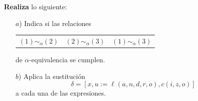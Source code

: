 \documentclass{article}
\begin{document}
\begin{itemize}
\begin{enumerate}
  \end{enumerate}
  \textbf{Realiza} lo siguiente:
  \begin{itemize}
  \item[$a$)] Indica si las relaciones
    \begin{center}
      \begin{tabular}{ c  c  c}
        $(1) \sim_{\alpha} (2)$ \hspace*{1cm} & $(2) \sim_{\alpha} (3)$ \hspace*{1cm} & $(1) \sim_{\alpha} (3)$
      \end{tabular} 
    \end{center}
    de $\alpha$-equivalencia se cumplen.
  \item[$b$)] Aplica la sustitución
    \[
    \delta = [x, u := \ell(a, n, d, r, o), c(i, z, o)]
    \]
    a cada una de las expresiones.
  \end{itemize}
\end{itemize}
\end{document}
